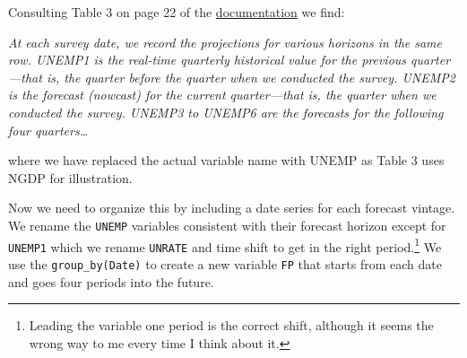 \documentclass[
  letterpaper,
]{book}
\begin{document}
\begin{tcolorbox}[enhanced jigsaw, breakable, left=2mm, arc=.35mm, toptitle=1mm, colbacktitle=quarto-callout-note-color!10!white, opacityback=0, bottomrule=.15mm, leftrule=.75mm, opacitybacktitle=0.6, title=\textcolor{quarto-callout-note-color}{\faInfo}\hspace{0.5em}{What are these variables?}, colframe=quarto-callout-note-color-frame, coltitle=black, titlerule=0mm, toprule=.15mm, bottomtitle=1mm, rightrule=.15mm, colback=white]

Consulting Table 3 on page 22 of the
\href{https://www.philadelphiafed.org/-/media/research-and-data/real-time-center/survey-of-professional-forecasters/spf-documentation.pdf}{documentation}
we find:

\emph{At each survey date, we record the projections for various
horizons in the same row. UNEMP1 is the real-time quarterly historical
value for the previous quarter---that is, the quarter before the quarter
when we conducted the survey. UNEMP2 is the forecast (nowcast) for the
current quarter---that is, the quarter when we conducted the survey.
UNEMP3 to UNEMP6 are the forecasts for the following four
quarters\ldots{}}

where we have replaced the actual variable name with UNEMP as Table 3
uses NGDP for illustration.

\end{tcolorbox}

Now we need to organize this by including a date series for each
forecast vintage. We rename the \texttt{UNEMP} variables consistent with
their forecast horizon except for \texttt{UNEMP1} which we rename
\texttt{UNRATE} and time shift to get in the right period.\footnote{Leading
  the variable one period is the correct shift, although it seems the
  wrong way to me every time I think about it.} We use the
\texttt{group\_by(Date)} to create a new variable \texttt{FP} that
starts from each date and goes four periods into the future.
\end{document}
